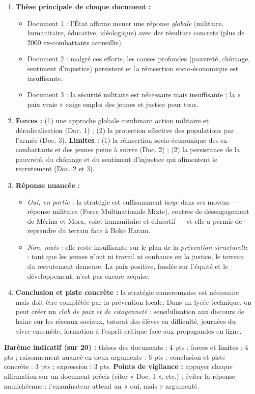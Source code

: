 \documentclass[11pt]{article}
\begin{document}
\begin{corrige}
\begin{enumerate}
\item \textbf{Thèse principale de chaque document :}
\begin{itemize}
\item Document 1 : l'État affirme mener une réponse \emph{globale} (militaire, humanitaire, éducative, idéologique) avec des résultats concrets (plus de 2000 ex-combattants accueillis).
\item Document 2 : malgré ces efforts, les causes profondes (pauvreté, chômage, sentiment d'injustice) persistent et la réinsertion socio-économique est insuffisante.
\item Document 3 : la sécurité militaire est nécessaire mais insuffisante ; la « paix vraie » exige emploi des jeunes et justice pour tous.
\end{itemize}
\item \textbf{Forces :} (1) une approche globale combinant action militaire et déradicalisation (Doc. 1) ; (2) la protection effective des populations par l'armée (Doc. 3). \textbf{Limites :} (1) la réinsertion socio-économique des ex-combattants et des jeunes peine à suivre (Doc. 2) ; (2) la persistance de la pauvreté, du chômage et du sentiment d'injustice qui alimentent le recrutement (Doc. 2 et 3).
\item \textbf{Réponse nuancée :}
\begin{itemize}
\item \emph{Oui, en partie :} la stratégie est suffisamment \emph{large} dans ses moyens — réponse militaire (Force Multinationale Mixte), centres de désengagement de Mérina et Mora, volet humanitaire et éducatif — et elle a permis de reprendre du terrain face à Boko Haram.
\item \emph{Non, mais :} elle reste insuffisante sur le plan de la \emph{prévention structurelle} : tant que les jeunes n'ont ni travail ni confiance en la justice, le terreau du recrutement demeure. La paix positive, fondée sur l'équité et le développement, n'est pas encore acquise.
\end{itemize}
\item \textbf{Conclusion et piste concrète :} la stratégie camerounaise est nécessaire mais doit être complétée par la prévention locale. Dans un lycée technique, on peut créer un \emph{club de paix et de citoyenneté} : sensibilisation aux discours de haine sur les réseaux sociaux, tutorat des élèves en difficulté, journées du vivre-ensemble, formation à l'esprit critique face aux propagandes en ligne.
\end{enumerate}
\textbf{Barème indicatif (sur 20) :} thèses des documents : 4 pts ; forces et limites : 4 pts ; raisonnement nuancé en deux arguments : 6 pts ; conclusion et piste concrète : 3 pts ; expression : 3 pts.
\textbf{Points de vigilance :} appuyer chaque affirmation sur un document précis (citer « Doc. 1 », etc.) ; éviter la réponse manichéenne : l'examinateur attend un « oui, mais » argumenté.
\end{corrige}
\end{document}
